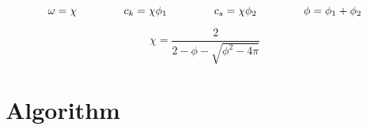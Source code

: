 \begin{equation}
	\omega = \chi \hspace{1.5cm} c_k = \chi \phi_1 \hspace{1.5cm} c_s = \chi \phi_2 \hspace{1.5cm} \phi = \phi_1 + \phi_2
	\label{eq:c_parameter}
\end{equation}

 \begin{equation}
	\chi = \dfrac{2}{2-\phi-\sqrt{\phi^2-4\pi}}
	\label{eq:chi_parameter}
\end{equation}



\section{Algorithm}
\label{sec:algorithm}







 


